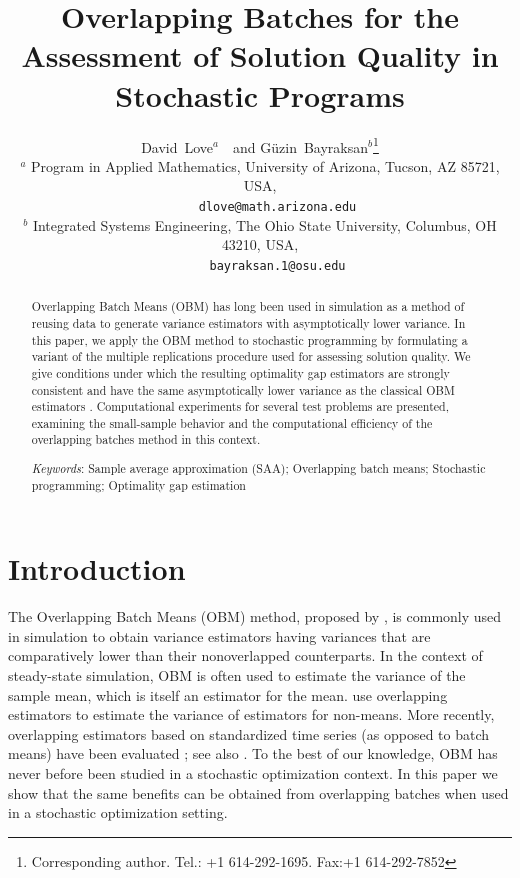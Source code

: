 \documentclass[12pt]{article}
\newcommand{\Keywords}[1]{\par\noindent 
{\small{\em Keywords\/}: #1}}
\begin{document}
\title{Overlapping Batches for the Assessment of Solution Quality in Stochastic Programs}

\author{David~Love$^{a}$\ \ and G\"{u}zin~Bayraksan$^{b}$\thanks{Corresponding author. Tel.: +1 614-292-1695. Fax:+1 614-292-7852}\\[6pt]
{\small
      $^{a}$ Program in Applied Mathematics, University of Arizona, Tucson, AZ 85721, USA,}\\
{\small \ \ \ \ \ \texttt{dlove@math.arizona.edu}} \\
{\small 
      $^{b}$ Integrated Systems Engineering, The Ohio State University, Columbus, OH 43210, USA,}\\
{\small \ \ \ \  \   \texttt{bayraksan.1@osu.edu}}}
\date{}

\maketitle

\begin{abstract}
\noindent Overlapping Batch Means (OBM) has long been used in simulation as a method of reusing data to generate variance estimators with asymptotically lower variance.
In this paper, we apply the OBM method to stochastic programming by formulating a variant of the multiple replications procedure used for assessing solution quality.
We give conditions under which the resulting optimality gap estimators are strongly consistent and have the same asymptotically lower variance as the classical OBM estimators \citep{Meketon1984,Welch1987}.
Computational experiments for several test problems are presented, examining the small-sample behavior and the computational efficiency of the overlapping batches method in this context.\medskip

\Keywords{Sample average approximation (SAA); Overlapping batch means;   Stochastic programming; Optimality gap estimation}
\end{abstract}

\section{Introduction}
\label{sec:intro}

The Overlapping Batch Means (OBM) method, proposed by \citet{Meketon1984}, is commonly used in simulation to obtain variance estimators having variances that are comparatively lower than their nonoverlapped counterparts. 
In the context of steady-state simulation, OBM is often used to estimate the variance of the sample mean, which is itself an estimator for the mean. 
\cite{SAH90} use overlapping estimators to estimate the variance of estimators for non-means. 
More recently, overlapping estimators based on standardized time series (as opposed to batch means) have been evaluated \citep{Alexopoulos01012007,Alexopoulos2007}; see also \citep{Meterelliyoz_etal_12}.
To the best of our knowledge, OBM has never before been studied in a stochastic optimization context. 
In this paper we show that the same benefits can be obtained from overlapping batches when used in a stochastic optimization setting.
  
\end{document}
